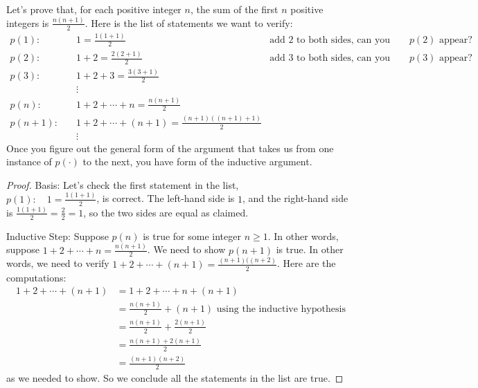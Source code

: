 \clearpage
\begin{exmp}
 Let's prove that, for each positive integer $n$, 
the sum of the first $n$ positive integers is $\displaystyle \frac{n(n+1)}{2}$.
Here is the list of statements we want to verify:
\begin{align*}
 p(1):\quad   & 1 = \frac{1(1+1)}{2}  &\text{add $2$ to both sides, can you make $p(2)$ appear?}\\
 p(2):\quad   & 1+2 = \frac{2(2+1)}{2} &\text{add $3$ to both sides,  can you make $p(3)$ appear?}\\
 p(3):\quad   & 1+2+3 = \frac{3(3+1)}{2} \\
              &\vdots \\
 p(n):\quad   & 1+2+\cdots+n = \frac{n(n+1)}{2} \\
 p(n+1):\quad & 1+2+\cdots+(n+1) = \frac{(n+1)((n+1)+1)}{2} \\
              &\vdots
\end{align*}
Once you figure out the general form of the argument%
%
 that takes us from one instance of $p(\cdot)$ to the next, you have form of the inductive argument.

\begin{proof}
 \textsf{Basis:} Let's check the first statement in the list,\\
 $\displaystyle p(1): \quad 1 = \frac{1(1+1)}{2}$,
  is correct. The left-hand side is $1$, and the right-hand side is
 $\displaystyle \frac{1(1+1)}{2}= \frac{2}{2} = 1$, so the two sides are equal
 as claimed.
 
 \textsf{Inductive Step:} Suppose $p(n)$ is true for some integer $n\geq 1$.
 In other words, suppose
  $1+2+\cdots+n = \frac{n(n+1)}{2}$. We need to show $p(n+1)$ is true.
 In other words, we need to verify 
 $1+2+\cdots+(n+1) = \frac{(n+1)((n+2)}{2}$.
 Here are the computations:%
 \begin{align*}
  1+2+\cdots+(n+1) &= 1+2+\cdots+n+(n+1) \\
  & = \frac{n(n+1)}{2} + (n+1) \text{ using the inductive hypothesis} \\
  & = \frac{n(n+1)}{2} + \frac{2(n+1)}{2} \\
  & = \frac{n(n+1) + 2(n+1)}{2} \\
  & = \frac{(n+1)(n+2)}{2}
 \end{align*}
 as we needed to show. So we conclude all the statements in the list are true.
\end{proof}
\end{exmp}

